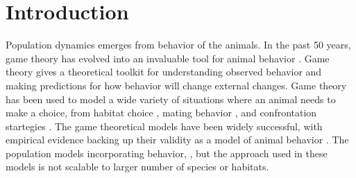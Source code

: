 \section{Introduction}
Population dynamics emerges from behavior of the animals.  In the past 50 years, game theory has evolved into an invaluable tool for   animal behavior . Game theory gives a theoretical toolkit for understanding  observed behavior and making predictions for how behavior will change  external changes. Game theory has been used to model a wide variety of situations where an animal needs to make a choice, from habitat choice \citep{krivan1997dynamic}, mating behavior  \citep{rapoport1967exploiter}, and confrontation startegies \citep{smith1973logic}. The game theoretical models have been widely successful, with empirical evidence backing up their validity as a model of animal behavior \citep{cooper1989communication,empirical_trait,behaviorial_effects}. The population models incorporating behavior, \citep{Krivan1998,genkai2007macrophyte, sadowski2019predator, cressman2010ideal,pinti2021co}, but the approach used in these models is not scalable to larger number of species or habitats.



